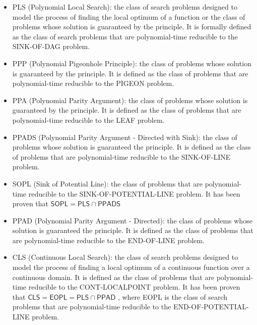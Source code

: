 \begin{itemize}
    \item \textsf{PLS} (Polynomial Local Search): the class of search problems designed to model the process of finding the local optimum of a function or the class of problems whose solution is guaranteed by the  principle. It is formally defined as the class of search problems that are polynomial-time reducible to the SINK-OF-DAG problem.
    
    \item \textsf{PPP} (Polynomial Pigeonhole Principle): the class of problems whose solution is guaranteed by the  principle. It is defined as the class of problems that are polynomial-time reducible to the PIGEON problem.
    
    \item \textsf{PPA} (Polynomial Parity Argument): the class of problems whose solution is guaranteed by the  principle. It is defined as the class of problems that are polynomial-time reducible to the LEAF problem.
    
    \item \textsf{PPADS} (Polynomial Parity Argument - Directed with Sink): the class of problems whose solution is guaranteed the  principle. It is defined as the class of problems that are polynomial-time reducible to the SINK-OF-LINE problem.
    
    \item \textsf{SOPL} (Sink of Potential Line): the class of problems that are polynomial-time reducible to the SINK-OF-POTENTIAL-LINE problem. It has been proven that $\mathsf{SOPL} = \mathsf{PLS} \cap \mathsf{PPADS}$ \cite{Further_collapses_TFNP}
    
    \item \textsf{PPAD} (Polynomial Parity Argument - Directed): the class of problems whose solution is guaranteed the  principle. It is defined as the class of problems that are polynomial-time reducible to the END-OF-LINE problem.
    
    \item \textsf{CLS} (Continuous Local Search): the class of search problems designed to model the process of finding a local optimum of a continuous function over a continuous domain. It is defined as the class of problems that are polynomial-time reducible to the CONT-LOCALPOINT problem. It has been proven that $\mathsf{CLS} = \mathsf{EOPL} = \mathsf{PLS} \cap \mathsf{PPAD}$ \cite{gradient_descent, Further_collapses_TFNP}, where \textsf{EOPL} is the class of search problems that are polynomial-time reducible to the END-OF-POTENTIAL-LINE problem.
\end{itemize}

